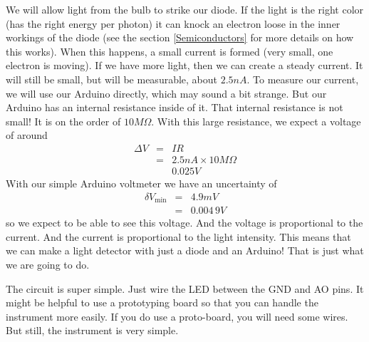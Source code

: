 We will allow light from the bulb to strike our diode. If the light is the
right color (has the right energy per photon) it can knock an electron loose
in the inner workings of the diode (see the section \ref{Semiconductors} for
more details on how this works). When this happens, a small current is
formed (very small, one electron is moving). If we have more light, then we
can create a steady current. It will still be small, but will be measurable,
about $2.5\unit{nA}$. To measure our current, we will use our Arduino
directly, which may sound a bit strange. But our Arduino has an internal
resistance inside of it. That internal resistance is not small! It is on the
order of $10\unit{M%
\Omega%
}.$ With this large resistance, we expect a voltage of around 
\begin{eqnarray*}
\Delta V &=&IR \\
&=&2.5\unit{nA}\times 10\unit{M%
\Omega%
} \\
&&0.025\unit{V}
\end{eqnarray*}%
With our simple Arduino voltmeter we have an uncertainty of 
\begin{eqnarray*}
\delta V_{\min } &=&4.9\unit{mV} \\
&=&0.004\,9\unit{V}
\end{eqnarray*}%
so we expect to be able to see this voltage. And the voltage is proportional
to the current. And the current is proportional to the light intensity. This
means that we can make a light detector with just a diode and an Arduino!
That is just what we are going to do.

The circuit is super simple. Just wire the LED between the GND and AO pins.
It might be helpful to use a prototyping board so that you can handle the
instrument more easily. If you do use a proto-board, you will need some
wires. But still, the instrument is very simple.

